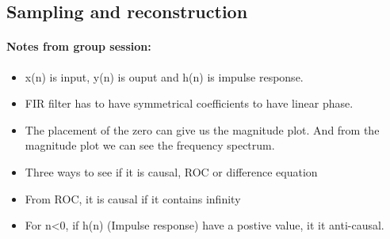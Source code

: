 \documentclass{article}
\begin{document}
\subsection{Sampling and reconstruction}

\paragraph{Notes from group session:}
\begin{itemize}
    \item x(n) is input, y(n) is ouput and h(n) is impulse response. 
    \item FIR filter has to have symmetrical coefficients to have linear phase.
    \item The placement of the zero can give us the magnitude plot. And from the magnitude plot we can see the frequency spectrum. 
    \item Three ways to see if it is causal, ROC or difference equation
    \item From ROC, it is causal if it contains infinity
    \item For n<0, if h(n) (Impulse response) have a postive value, it it anti-causal.
\end{itemize}
\end{document}
